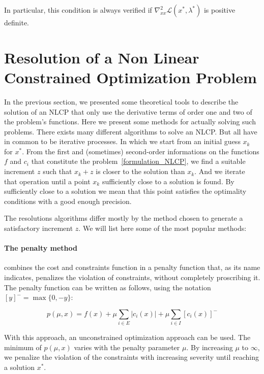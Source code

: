 In particular, this condition is always verified if $\nabla_{xx}^2\mathcal{L}(x^*,\lambda^*)$ is positive definite.

\section{Resolution of a Non Linear Constrained Optimization Problem}
\label{sec:resolution_of_a_non_linear_constrained_optimization_problem}

In the previous section, we presented some theoretical tools to describe the solution of an NLCP that only use the derivative terms of order one and two of the problem's functions.
Here we present some methods for actually solving such problems.
There exists many different algorithms to solve an NLCP\@.
But all have in common to be iterative processes.
In which we start from an initial guess $x_k$ for $x^*$.
From the first and (sometimes) second-order informations on the functions $f$ and $c_i$ that constitute the problem~\ref{formulation_NLCP}, we find a suitable increment $z$ such that $x_k+z$ is closer to the solution than $x_k$.
And we iterate that operation until a point $x_k$ sufficiently close to a solution is found.
By sufficiently close to a solution we mean that this point satisfies the optimality conditions with a good enough precision.

The resolutions algorithms differ mostly by the method chosen to generate a satisfactory increment $z$. We will list here some of the most popular methods:

\paragraph{The penalty method} combines the cost and constraints function in a penalty function that, as its name indicates, penalizes the violation of constraints, without completely proscribing it.
The penalty function can be written as follows, using the notation ${[y]}^- = \max\{0, -y\}$:

\begin{equation}
  \label{penalty_function}
  p(\mu, x) = f(x) + \mu \sum_{i\in E}|c_i(x)| + \mu \sum_{i\in I} {[c_i(x)]}^-
\end{equation}

With this approach, an unconstrained optimization approach can be used.
The minimum of $p(\mu,x)$ varies with the penalty parameter $\mu$.
By increasing $\mu$ to $\infty$, we penalize the violation of the constraints with increasing severity until reaching a solution $x^*$.

